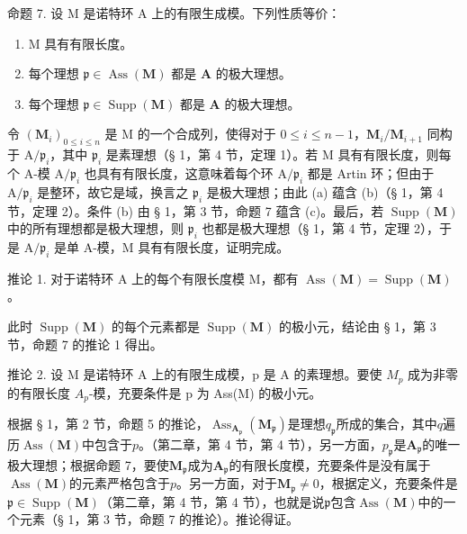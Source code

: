 命题 7. 设 M 是诺特环 A 上的有限生成模。下列性质等价：

\begin{enumerate}
\def\labelenumi{(\alph{enumi})}
\item
  M 具有有限长度。
\item
  每个理想 \(\mathfrak{p} \in \operatorname{Ass}(\mathbf{M})\) 都是 \(\mathbf{A}\) 的极大理想。
\item
  每个理想 \(\mathfrak{p} \in \operatorname{Supp}(\mathbf{M})\) 都是 \(\mathbf{A}\) 的极大理想。
\end{enumerate}

令 \((\mathbf{M}_i)_{0\leqslant i\leqslant n}\) 是 M 的一个合成列，使得对于 \(0\leqslant i\leqslant n - 1\)，\(\mathbf{M}_i / \mathbf{M}_{i + 1}\) 同构于 \(\mathrm{A} / \mathfrak{p}_i\)，其中 \(\mathfrak{p}_i\) 是素理想（§ 1，第 4 节，定理 1）。若 M 具有有限长度，则每个 A-模 \(\mathrm{A} / \mathfrak{p}_i\) 也具有有限长度，这意味着每个环 \(\mathrm{A} / \mathfrak{p}_i\) 都是 Artin 环；但由于 \(\mathrm{A} / \mathfrak{p}_i\) 是整环，故它是域，换言之 \(\mathfrak{p}_i\) 是极大理想；由此 (a) 蕴含 (b)（§ 1，第 4 节，定理 2）。条件 (b) 由 § 1，第 3 节，命题 7 蕴含 (c)。最后，若 \(\operatorname {Supp}(\mathbf{M})\) 中的所有理想都是极大理想，则 \(\mathfrak{p}_i\) 也都是极大理想（§ 1，第 4 节，定理 2），于是 \(\mathrm{A} / \mathfrak{p}_i\) 是单 A-模，M 具有有限长度，证明完成。

推论 1. 对于诺特环 A 上的每个有限长度模 M，都有 \(\operatorname{Ass}(\mathbf{M}) = \operatorname{Supp}(\mathbf{M})\)。

此时 \(\operatorname{Supp}(\mathbf{M})\) 的每个元素都是 \(\operatorname{Supp}(\mathbf{M})\) 的极小元，结论由 § 1，第 3 节，命题 7 的推论 1 得出。

推论 2. 设 M 是诺特环 A 上的有限生成模，p 是 A 的素理想。要使 \(M_{p}\) 成为非零的有限长度 \(A_{p}\)-模，充要条件是 p 为 Ass(M) 的极小元。

根据 § 1，第 2 节，命题 5 的推论，\(\operatorname{Ass}_{\mathbf{A}_{\mathfrak{p}}}(\mathbf{M}_{\mathfrak{p}})\)是理想\(q_{\mathfrak{p}}\)所成的集合，其中\(q\)遍历\(\operatorname{Ass}(\mathbf{M})\)中包含于\(p\)。（第二章，第 4 节，第 4 节），另一方面，\(p_{\mathfrak{p}}\)是\(\mathbf{A}_{\mathfrak{p}}\)的唯一极大理想；根据命题 7，要使\(\mathbf{M}_{\mathfrak{p}}\)成为\(\mathbf{A}_{\mathfrak{p}}\)的有限长度模，充要条件是没有属于\(\operatorname{Ass}(\mathbf{M})\)的元素严格包含于\(p\)。另一方面，对于\(\mathbf{M}_{\mathfrak{p}} \neq 0\)，根据定义，充要条件是\(\mathfrak{p} \in \operatorname{Supp}(\mathbf{M})\)（第二章，第 4 节，第 4 节），也就是说\(\mathfrak{p}\)包含\(\operatorname{Ass}(\mathbf{M})\)中的一个元素（§ 1，第 3 节，命题 7 的推论）。推论得证。

